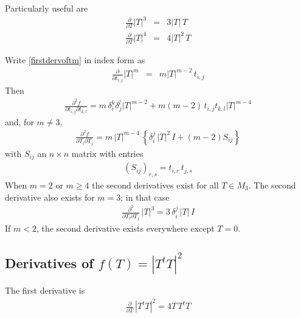 \documentclass{report}
\begin{document}
\noindent Particularly useful are
\begin{eqnarray}
\label{tcubed}
\frac{\partial}{\partial T} |T|^3 & = & 3 |T| \, T \\
\frac{\partial}{\partial T} |T|^4 & = & 4 |T|^2 \, T 
\end{eqnarray}

 \newline

\noindent Write \ref{firstdervoftm} in index form as
\begin{eqnarray}
\frac{\partial}{\partial t_{i,j}} |T|^m & = & m |T|^{m-2} \, t_{i,j}
\end{eqnarray}
Then
\begin{eqnarray}
\frac{\partial^2 f}{\partial t_{i,j} \partial t_{k,l}} = m \, \delta_i^k \delta_j^l |T|^{m-2} + m (m-2) \, t_{i,j} t_{k,l} |T|^{m-4}
\end{eqnarray}
and, for $m \neq 3$,
\begin{eqnarray}
\label{hesstm}
\frac{\partial^2 f}{\partial T_i \partial T_j} = m \,  |T|^{m-4} \, \left\{ \delta_i^j \, |T|^2 \, I + (m-2) S_{ij} \right\} 
\end{eqnarray}
with $S_{ij}$ an $n \times n$ matrix with entries
\begin{eqnarray}
\left( S_{ij} \right)_{r,s} = t_{i,r} \, t_{j,s} \label{sij}
\end{eqnarray}
When $m=2$ or $m \geq 4$ the second derivatives exist for all $T \in M_3$.
The second derivative also exists for $m=3$; in that case
\begin{eqnarray}
\label{hesst3}
\frac{\partial^2}{\partial T_i \partial T_j} \, |T|^3 = 3 \,  \delta_i^j \, |T| \, I 
\end{eqnarray}
If $m<2$, the second derivative exists everywhere except $T=0$. \newline

\subsection{Derivatives of $f(T)=|T^t T|^2$}

\noindent The first derivative is
\begin{eqnarray}
\frac{\partial}{\partial T} \, |T^t T|^2 = 4 T \, T^t T \label{dttt}
\end{eqnarray}
\end{document}
